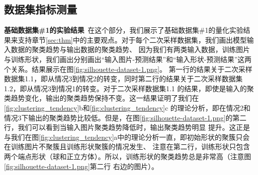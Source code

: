 \documentclass[bachelor, nocolorlinks, printoneside]{seuthesis} %
\begin{document}
\begin{Main}
\subsection{数据集指标测量} 

\textbf{基础数据集\#1的实验结果}~在这个部分，我们展示了基础数据集\#1的量化实验结果来支持章节\ref{sec:thm}中的主要观点。对于每个二次采样数据集，我们画出模型输入数据的聚类趋势与输出数据的聚类趋势、
因为我们有两类输入数据，训练图片与训练形状，我们画出分别画出“输入图片-预测结果”和“输入形状-预测结果”这两个关系。结果展示在图\ref{fig:silhouette-dataset-1.png}。
第一行的结果关于二次采样数据集1.1，即从情况3到情况2的转变，同时第二行的结果关于二次采样数据集1.2，即从情况3到情况1的转变。对于二次采样数据集1.1
的结果，即使是输入的聚类趋势变化，输出的聚类趋势保持不变。这一结果证明了我们在\ref{fig:clustering_tendency}b和\ref{fig:clustering_tendency}c
的理论分析，即在情况2和情况3下输出的聚类趋势比较低。但是，在图\ref{fig:silhouette-dataset-1.png}的第二行，我们可以看到当输入图片聚类趋势降低时，输出聚类趋势明显
提升。这正是与我们在图\ref{fig:clustering_tendency}a中的理论分析一直，即初始形状的聚簇只会在训练图片不聚簇且训练形状聚簇的情况发生、
注意在第二行，训练形状只包含两个端点形状（球和正立方体）。所以，训练形状的聚类趋势总是非常高（注意图\ref{fig:silhouette-dataset-1.png}第二行
右边的图片）。


\end{Main}
\end{document}

